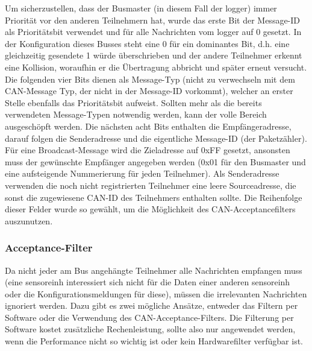 Um sicherzustellen, dass der Busmaster (in diesem Fall der \gls{logger}) immer Priorität vor den anderen Teilnehmern hat, wurde das erste Bit der Message-ID als Prioritätsbit verwendet und für alle Nachrichten vom \gls{logger} auf 0 gesetzt. In der Konfiguration dieses Busses steht eine 0 für ein dominantes Bit, d.h. eine gleichzeitig gesendete 1 würde überschrieben und der andere Teilnehmer erkennt eine Kollision, woraufhin er die Übertragung abbricht und später erneut versucht. Die folgenden vier Bits dienen als Message-Typ (nicht zu verwechseln mit dem CAN-Message Typ, der nicht in der Message-ID vorkommt), welcher an erster Stelle ebenfalls das Prioritätsbit aufweist. Sollten mehr als die bereits verwendeten Message-Typen notwendig werden, kann der volle Bereich ausgeschöpft werden. Die nächsten acht Bits enthalten die Empfängeradresse, darauf folgen die Senderadresse und die eigentliche Message-ID (der Paketzähler). Für eine Broadcast-Message wird die Zieladresse auf 0xFF gesetzt, ansonsten muss der gewünschte Empfänger angegeben werden (0x01 für den Busmaster und eine aufsteigende Nummerierung für jeden Teilnehmer). Als Senderadresse verwenden die noch nicht registrierten Teilnehmer eine leere Sourceadresse, die sonst die zugewiesene CAN-ID des Teilnehmers enthalten sollte. Die Reihenfolge dieser Felder wurde so gewählt, um die Möglichkeit des CAN-Acceptancefilters auszunutzen.

\subsubsection{Acceptance-Filter}
Da nicht jeder am Bus angehängte Teilnehmer alle Nachrichten empfangen muss (eine \gls{sensoreinh} interessiert sich nicht für die Daten einer anderen \gls{sensoreinh} oder die Konfigurationsmeldungen für diese), müssen die irrelevanten Nachrichten ignoriert werden. Dazu gibt es zwei mögliche Ansätze, entweder das Filtern per Software oder die Verwendung des CAN-Acceptance-Filters. Die Filterung per Software kostet zusätzliche Rechenleistung, sollte also nur angewendet werden, wenn die Performance nicht so wichtig ist oder kein Hardwarefilter verfügbar ist.

